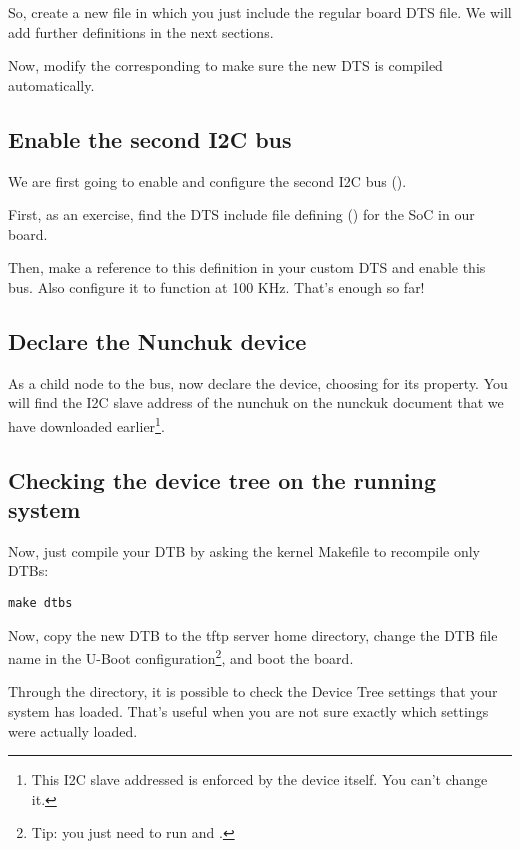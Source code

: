 So, create a new  file in which you
just include the regular board DTS file. We will add further definitions
in the next sections.

Now, modify the corresponding  to make sure the
new DTS is compiled automatically.

\subsection{Enable the second I2C bus}

We are first going to enable and configure the second I2C bus
().

First, as an exercise, find the DTS include file defining ()
for the SoC in our board.

Then, make a reference to this definition in your custom DTS and
enable this bus. Also configure it to function at 100 KHz. That's
enough so far!

\subsection{Declare the Nunchuk device}

As a child node to the  bus, now declare the 
device, choosing  for its 
property. You will find the I2C slave address of the nunchuk on the
nunckuk document that we have downloaded earlier\footnote{This I2C slave
addressed is enforced by the device itself. You can't change it.}.

\subsection{Checking the device tree on the running system}

Now, just compile your DTB by asking the kernel Makefile to recompile
only DTBs:

\begin{verbatim}
make dtbs
\end{verbatim}

Now, copy the new DTB to the tftp server home directory, change the DTB
file name in the U-Boot configuration\footnote{Tip: you just need to run
 and .}, and boot the board.

Through the  directory, it is possible to check
the Device Tree settings that your system has loaded. That's useful when
you are not sure exactly which settings were actually loaded.

